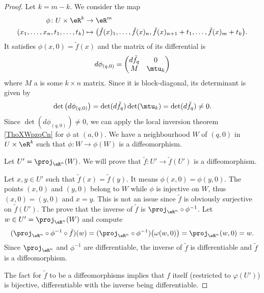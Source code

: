 \begin{proof}
    Let \( k=m-k\). We consider the map
    \begin{equation}
        \begin{aligned}
            \phi\colon U\times \eR^k&\to \eR^m \\
            (x_1,\ldots, x_n,t_1,\ldots, t_k)&\mapsto \big( \tilde f(x)_1,\ldots, \tilde f(x)_n,\tilde f(x)_{n+1}+t_1,\ldots, \tilde f(x)_m+t_k \big). 
        \end{aligned}
    \end{equation}
    It satisfies \( \phi(x,0)=\tilde f(x)\) and the matrix of its differential is
    \begin{equation}
        d\phi_{(q,0)}=\begin{pmatrix}
            d\tilde f_q    &   0   \\
            M    &   \mtu_k   
        \end{pmatrix}
    \end{equation}
    where \( M\) a is some \( k\times n\) matrix. Since it is block-diagonal, its determinant is given by
    \begin{equation}
        \det\big( d\phi_{(q,0)} \big)=\det(d\tilde f_q)\det(\mtu_k)=\det(d\tilde f_q)\neq 0.
    \end{equation}
    Since \( \det(d\phi_{(q,0)})\neq 0\), we can apply the local inversion theorem \ref{ThoXWpzqCn} for \( \phi\) at \( (a,0)\). We have a neighbourhood \( W\) of \( (q,0)\) in \( U\times \eR^k\) such that \( \phi\colon W\to \phi(W)\) is a diffeomorphism.

    Let \( U'=\proj_{\eR^n}(W)\). We will prove that \( \tilde f\colon U'\to \tilde f(U')\) is a diffeomorphism.
    \begin{subproof}
    \spitem[Injective]
        Let \( x,y\in U'\) such that \( \tilde f(x)=\tilde f(y)\). It means \( \phi(x,0)=\phi(y,0)\). The points \( (x,0)\) and \( (y,0)\) belong to \( W\) while \( \phi\) is injective on \( W\), thus \( (x,0)=(y,0)\) and \( x=y\).
    \spitem[Surjective]
        This is not an issue since \( \tilde f\) is obviously surjective on \( \tilde f(U')\).
        The prove that the inverse of \( \tilde f\) is \( \proj_{\eR^n}\circ \phi^{-1}\). Let \( w\in U'=\proj_{\eR^n}(W)\) and compute
        \begin{equation}
                (\proj_{\eR^n}\circ \phi^{-1}\circ\tilde f)(w)=(\proj_{\eR^n}\circ\phi^{-1})\big( \omega(w,0) \big)=\proj_{\eR^n}(w,0)=w.
        \end{equation}
\spitem[Diffeomorphism]
    Since \( \proj_{\eR^n}\) and \( \phi^{-1}\) are differentiable, the inverse of \( \tilde f\) is differentiable and \( \tilde f\) is a diffeomorphism.
    \end{subproof}
    The fact for \( \tilde f\) to be a diffeomorphisms implies that \( f\) itself (restricted to \( \varphi(U')\)) is bijective, differentiable with the inverse being differentiable.
\end{proof}

